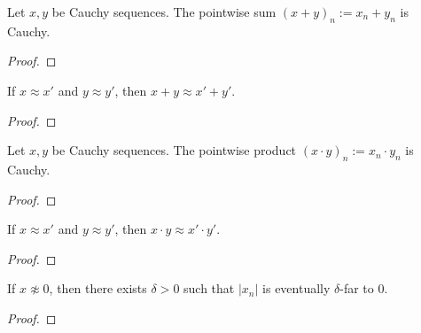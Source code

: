 \begin{lemma}
    \label{MyPrereal.IsCauchy.add}
    \leanok
    Let $x,y$ be Cauchy sequences.
    The pointwise sum $(x + y)_n := x_n + y_n$ is Cauchy.
\end{lemma}
\begin{proof}
    \leanok
\end{proof}



\begin{lemma}
    \label{MyPrereal.add_quotient}
    \leanok
    If $x \approx x'$ and $y \approx y'$, then $x+y \approx x'+y'$.
\end{lemma}
\begin{proof}
    \leanok
\end{proof}

\begin{lemma}
    \label{MyPrereal.IsCauchy.mul}
    \leanok
    Let $x,y$ be Cauchy sequences.
    The pointwise product $(x \cdot y)_n := x_n \cdot y_n$ is Cauchy.
\end{lemma}
\begin{proof}
    \leanok
\end{proof}

\begin{lemma}
    \label{MyPrereal.mul_quotient}
    \leanok
    If $x \approx x'$ and $y \approx y'$, then $x \cdot y \approx x' \cdot y'$.
\end{lemma}
\begin{proof}
    \leanok
\end{proof}

\begin{lemma}
    \label{MyPrereal.pos_of_not_equiv_zero}
    \leanok
    If $x \not\approx 0$, then there exists $\delta > 0$ such that $|x_n|$ is eventually $\delta$-far to $0$.
\end{lemma}
\begin{proof}
    \leanok
\end{proof}

